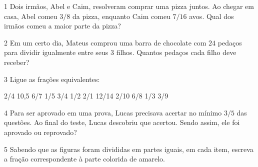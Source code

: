 
\num{1}  Dois irmãos, Abel e Caim, resolveram comprar uma pizza juntos. Ao
chegar em casa, Abel comeu $3/8$ da pizza, enquanto Caim comeu $7/16$ avos.
Qual dos irmãos comeu a maior parte da pizza?


\num{2}  Em um certo dia, Mateus comprou uma barra de chocolate com $24$ pedaços
para dividir igualmente entre seus $3$ filhos. Quantos pedaços cada filho
deve receber?



\num{3}  Ligue as frações equivalentes:

\begin{mdframed}[linewidth=2pt,linecolor=azul!20,backgroundcolor=azul!20,roundcorner=2pt]
2/4 \hfill 10,5    
6/7 \hfill 1/5    
3/4 \hfill 1/2    
2/1 \hfill 12/14    
2/10 \hfill 6/8    
1/3 \hfill 3/9    
\end{mdframed}


\num{4}  Para ser aprovado em uma prova, Lucas precisava acertar no mínimo $3/5$
das questões. Ao final do teste, Lucas descobriu que acertou. Sendo
assim, ele foi aprovado ou reprovado?


\num{5}  Sabendo que as figuras foram divididas em partes iguais, em cada
item, escreva a fração correspondente à parte colorida de amarelo.

